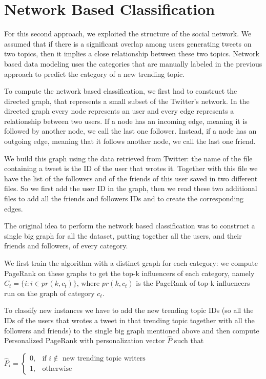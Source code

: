 \documentclass[journal,11pt]{vgtc}
\begin{document}
\section{Network Based Classification}
For this second approach, we exploited the structure of the social network. We assumed that if there is a significant overlap among users
generating tweets on two topics, then it implies a close relationship between these two topics.
Network based data modeling uses the categories that are manually labeled in the previous approach to predict
the category of a new trending topic.

To compute the network based classification, we first had to construct the directed graph, that represents a small
subset of the Twitter's network.
In the directed graph every node represents an user and every edge represents a relationship between two users.
If a node has an incoming edge, meaning it is followed by another node, we call the last one follower. Instead, if a node has an
outgoing edge, meaning that it follows another node, we call the last one friend.

We build this graph using the data retrieved from Twitter: the name of the file containing a tweet is the ID of the user that wrotes it.
Together with this file we have the list of the followers and of the friends of this user saved in two different files.
So we first add the user ID in the graph, then we read these two additional files to add all the friends and followers IDs and to
create the corresponding edges.

The original idea to perform the network based classification was to construct a single big graph for all the dataset, putting
together all the users, and their friends and followers, of every category.

We first train the algorithm with a distinct graph for each category: we compute PageRank on these graphs to get
the top-k influencers of each category, namely $C_t=\{i : i \in pr(k, c_t)\}$, where $pr(k, c_t)$ is the PageRank of
top-k influencers run on the graph of category $c_t$.

To classify new instances we have to add the new trending topic IDs (so all the IDs of the users that wrotes a tweet in that
trending topic together with all the followers and friends) to the single big graph mentioned above and then compute
Personalized PageRank with personalization vector $\hat{P}$ such that

\bigskip

\begin{center}
$
\hat{P}_i=
\begin{cases}
  0, & \mbox{if } i \not\in \mbox{ new trending topic writers} \\
  1, & \mbox{otherwise }
\end{cases}
$
\end{center}
\end{document}
